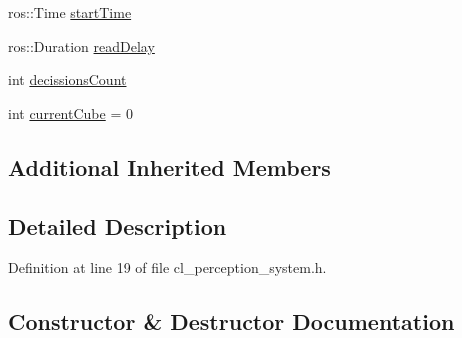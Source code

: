 \begin{DoxyCompactItemize}
\item 
ros\+::\+Time \hyperlink{classsm__fetch__two__table__pick__n__place__1_1_1cl__perception__system_1_1ClPerceptionSystem_a3b88edd8d62e132052c3f0908839dbb1}{start\+Time}
\item 
ros\+::\+Duration \hyperlink{classsm__fetch__two__table__pick__n__place__1_1_1cl__perception__system_1_1ClPerceptionSystem_aa10a1ed21636e7bdf001895860075383}{read\+Delay}
\item 
int \hyperlink{classsm__fetch__two__table__pick__n__place__1_1_1cl__perception__system_1_1ClPerceptionSystem_a3639b112c2051d9d5f15716c8a72f127}{decissions\+Count}
\item 
int \hyperlink{classsm__fetch__two__table__pick__n__place__1_1_1cl__perception__system_1_1ClPerceptionSystem_a0acc9100f7de93d128c356fe928f311a}{current\+Cube} = 0
\end{DoxyCompactItemize}
\subsection*{Additional Inherited Members}


\subsection{Detailed Description}


Definition at line 19 of file cl\+\_\+perception\+\_\+system.\+h.



\subsection{Constructor \& Destructor Documentation}
\mbox{\label{classsm__fetch__two__table__pick__n__place__1_1_1cl__perception__system_1_1ClPerceptionSystem_ae3757599dd4468520737570786a7ad5c}} 

